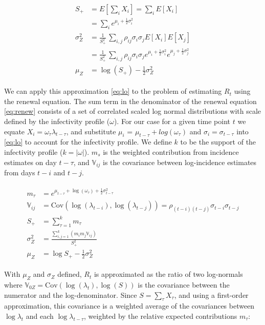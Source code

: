\documentclass[10pt,letterpaper]{article}
\begin{document}
\begin{eqnarray}
\begin{aligned}
	S_+ &= E\left[\sum_i X_i \right] = \sum_i
	E[X_i] \\
	&= \sum_i e^{\mu_i + \frac{1}{2}\sigma_i^2}
	\\
	\sigma^2_{Z} &= \frac{1}{S_+^2} \, \sum_{i,j}
	  \rho_{ij} \sigma_i \sigma_j E[X_i] E[X_j] \\
	  &= \frac{1}{S_+^2} \, \sum_{i,j}
	  \rho_{ij} \sigma_i \sigma_j e^{\mu_i+\frac{1}{2}\sigma_i^2}
	  e^{\mu_j+\frac{1}{2}\sigma_j^2}
	\\
	\mu_Z &= \log(S_+) - \frac{1}{2}\sigma_{Z}^2
\end{aligned}
\label{eq:lo}
\end{eqnarray}

We can apply this approximation \eqref{eq:lo} to the problem of estimating $R_t$ using the renewal equation. The sum term in the denominator of the renewal equation \eqref{eq:renew} consists of a set of correlated scaled log normal distributions with scale defined by the infectivity profile ($\omega$). For our case for a given time point $t$ we equate $X_i = \omega_{\tau} \lambda_{t-\tau}$, and substitute $\mu_i$ = $\mu_{t-\tau} + log(\omega_{\tau})$ and $\sigma_i = \sigma_{t-\tau}$ into \eqref{eq:lo} to account for the infectivity profile. We define $k$ to be the support of the infectivity profile ($k = |\omega|$). $m_{s}$ is the weighted contribution from incidence estimates on day $t-\tau$, and $\mathbb{V}_{ij}$ is the covariance between log-incidence estimates from days $t-i$ and $t-j$.

\begin{eqnarray}
\begin{aligned}
	m_{\tau} &= e^{\mu_{t-\tau} + \log (\omega_{\tau}) + \frac{1}{2}\sigma_{t-\tau}^2 } \\
	\mathbb{V}_{ij} &= \text{Cov}\left(\log(\lambda_{t-i}), \log( \lambda_{t-j})\right) = \rho_{(t-i)(t-j)} \sigma_{t-i} \sigma_{t-j} \\
	S_{+} &= \sum_{\tau=1}^k { m_{\tau} } \\
	\sigma_{Z}^2 &=
	  \frac{
	    \sum_{i,j=1}^k {
  	      (m_{i} m_{j} \mathbb{V}_{ij})
	    }
	  }{S_{+}^2}	\\
	\mu_{Z} &= \log S_+ - \frac{1}{2}\sigma_{Z}^2
\end{aligned}
\end{eqnarray}

With $\mu_{Z}$ and $\sigma_{Z}$ defined, $R_t$ is approximated as the ratio of two log-normals where $\mathbb{V}_{0Z} = \text{Cov}(\log (\lambda_t), \log (S))$ is the covariance between the numerator and the log-denominator. Since $S = \sum_\tau X_\tau$, and using a first-order approximation, this covariance is a weighted average of the covariances between $\log \lambda_t$ and each $\log \lambda_{t-\tau}$, weighted by the relative expected contributions $m_\tau$:
\end{document}
